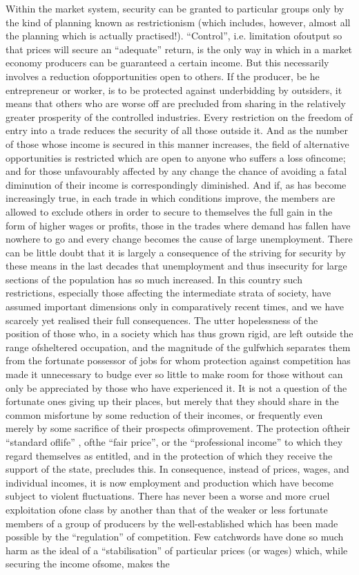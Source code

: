 \documentclass[11pt,openany]{book}
\begin{document}
Within the market system, security can be granted to particular groups only by the kind of planning known as restrictionism (which includes, however, almost all the planning which is actually practised!). ``Control'', i.e. limitation ofoutput so that prices will secure an ``adequate'' return, is the only way in which in a market economy producers can be guaranteed a certain income. But this necessarily involves a reduction ofopportunities open to others. If the producer, be he entrepreneur or worker, is to be protected against underbidding by outsiders, it means that others who are worse off are precluded from sharing in the relatively greater prosperity of the controlled industries. Every restriction on the freedom of entry into a trade reduces the security of all those outside it. And as the number of those whose income is secured in this manner increases, the field of alternative opportunities is restricted which are open to anyone who suffers a loss ofincome; and for those unfavourably affected by any change the chance of avoiding a fatal diminution of their income is correspondingly diminished. And if, as has become increasingly true, in each trade in which conditions improve, the members are allowed to exclude others in order to secure to themselves the full gain in the form of higher wages or profits, those in the trades where demand has fallen have nowhere to go and every change becomes the cause of large unemployment. There can be little doubt that it is largely a consequence of the striving for security by these means in the last decades that unemployment and thus insecurity for large sections of the population has so much increased. In this country such restrictions, especially those affecting the intermediate strata of society, have assumed important dimensions only in comparatively recent times, and we have scarcely yet realised their full consequences. The utter hopelessness of the position of those who, in a society which has thus grown rigid, are left outside the range ofsheltered occupation, and the magnitude of the gulfwhich separates them from the fortunate possessor of jobs for whom protection against competition has made it unnecessary to budge ever so little to make room for those without can only be appreciated by those who have experienced it. It is not a question of the fortunate ones giving up their places, but merely that they should share in the common misfortune by some reduction of their incomes, or frequently even merely by some sacrifice of their prospects ofimprovement. The protection oftheir ``standard oflife'' , ofthe ``fair price'', or the ``professional income'' to which they regard themselves as entitled, and in the protection of which they receive the support of the state, precludes this. In consequence, instead of prices, wages, and individual incomes, it is now employment and production which have become subject to violent fluctuations. There has never been a worse and more cruel exploitation ofone class by another than that of the weaker or less fortunate members of a group of producers by the well-established which has been made possible by the ``regulation'' of competition. Few catchwords have done so much harm as the ideal of a ``stabilisation'' of particular prices (or wages) which, while securing the income ofsome, makes the 
\end{document}
